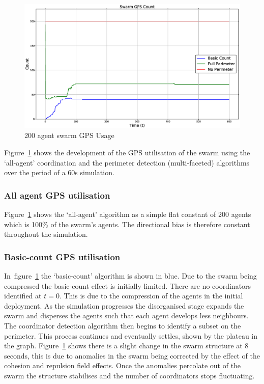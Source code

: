 \begin{figure}[H]
\begin{center}
\includegraphics[width=14cm]{CHAPTER-6/figures/SwarmPerimeter1}
\end{center}
\caption{200 agent swarm GPS Usage\label{fig:SwarmPerimeter1}}
\end{figure}

Figure~\ref{fig:SwarmPerimeter1} shows the development of the GPS utilisation of the swarm using the `all-agent' coordination and the perimeter detection (multi-faceted) algorithms over the period of a 60s simulation. 

\subsubsection{All agent GPS utilisation\label{section:SwarmPerimeter2}}
Figure~\ref{fig:SwarmPerimeter1} shows the `all-agent' algorithm as a simple flat constant of 200 agents which is 100\% of the swarm's agents. The directional bias is therefore constant throughout the simulation. 

\subsubsection{Basic-count GPS utilisation\label{section:SwarmPerimeter3}}
In~figure~\ref{fig:SwarmPerimeter1} the `basic-count' algorithm is shown in blue. Due to the swarm being compressed the basic-count effect is initially limited. There are no coordinators identified at $t=0$. This is due to the compression of the agents in the initial deployment. As the simulation progresses the disorganised stage expands the swarm and disperses the agents such that each agent develops less neighbours. The coordinator detection algorithm then begins to identify a subset on the perimeter. This process continues and eventually settles, shown by the plateau in the graph. Figure~\ref{fig:SwarmPerimeter1} shows there is a slight change in the swarm structure at 8 seconds, this is due to anomalies in the swarm being corrected by the effect of the cohesion and repulsion field effects. Once the anomalies percolate out of the swarm the structure stabilises and the number of coordinators stops fluctuating.

